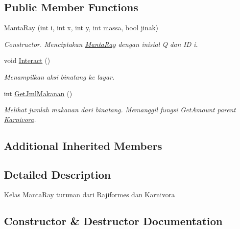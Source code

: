 \subsection*{Public Member Functions}
\begin{DoxyCompactItemize}
\item 
\hyperlink{classMantaRay_a0e939e0eec733dabc1af002e1530f71e}{Manta\+Ray} (int i, int x, int y, int massa, bool jinak)
\begin{DoxyCompactList}\small\item\em Constructor. Menciptakan \hyperlink{classMantaRay}{Manta\+Ray} dengan inisial \textquotesingle{}Q\textquotesingle{} dan ID i. \end{DoxyCompactList}\item 
void \hyperlink{classMantaRay_a33f574ba71ca6dea1eb7494724d79e01}{Interact} ()\hypertarget{classMantaRay_a33f574ba71ca6dea1eb7494724d79e01}{}\label{classMantaRay_a33f574ba71ca6dea1eb7494724d79e01}

\begin{DoxyCompactList}\small\item\em Menampilkan aksi binatang ke layar. \end{DoxyCompactList}\item 
int \hyperlink{classMantaRay_a1bd6cf276ee3033d181f6b91297da09e}{Get\+Jml\+Makanan} ()
\begin{DoxyCompactList}\small\item\em Melihat jumlah makanan dari binatang. Memanggil fungsi Get\+Amount parent \hyperlink{classKarnivora}{Karnivora}. \end{DoxyCompactList}\end{DoxyCompactItemize}
\subsection*{Additional Inherited Members}


\subsection{Detailed Description}
Kelas \hyperlink{classMantaRay}{Manta\+Ray} turunan dari \hyperlink{classRajiformes}{Rajiformes} dan \hyperlink{classKarnivora}{Karnivora} 

\subsection{Constructor \& Destructor Documentation}
